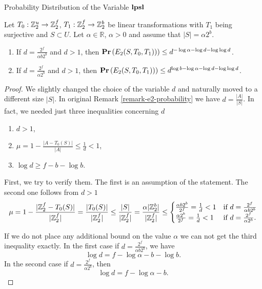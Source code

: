 \begin{section}{Probability Distribution of the Variable \texorpdfstring{$\mathbf{lpsl}$}{lpsl}}
\begin{statement}
\label{statement-e2-probability-linear-good}
Let $T_0: \mathbb{Z}_{2}^{u} \rightarrow \mathbb{Z}_{2}^{f}$, $T_1: \mathbb{Z}_{2}^{f} \rightarrow \mathbb{Z}_{2}^{b}$ be linear transformations with $T_1$ being surjective and $S \subset U$. Let $\alpha \in \mathbb{R}$, $\alpha > 0$ and assume that $|S| = \alpha 2 ^ b$.
\begin{enumerate}
\item If $d = \frac{2 ^ f}{\alpha b 2 ^ b}$ and $d > 1$, then $\mathbf{Pr}\left(E_2(S, T_0, T_1))\right) \leq d ^ {-\log \alpha - \log d - \log \log d}$.
\item If $d = \frac{2 ^ f}{\alpha 2 ^ b}$ and $d > 1$, then $\mathbf{Pr}\left(E_2(S, T_0, T_1))\right) \leq d ^ {\log b - \log \alpha - \log d - \log \log d}$.
\end{enumerate}
\end{statement}
\begin{proof}
We slightly changed the choice of the variable $d$ and naturally moved to a different size $|S|$. In original Remark \ref{remark-e2-probability} we have $d = \frac{|A|}{|S|}$. In fact, we needed just three inequalities concerning $d$
\begin{enumerate}
\item $d > 1$,
\item $\mu = 1 - \frac{|A - T_0(S)|}{|A|} \leq \frac{1}{d} < 1$,
\item $\log d \geq f - b - \log b$.
\end{enumerate}

First, we try to verify them. The first is an assumption of the statement. The second one follows from $d > 1$
\[
	\mu = 1 - \frac{|\mathbb{Z}_{2}^{f} - T_0(S)|}{|\mathbb{Z}_{2}^{f}|} = \frac{|T_0(S)|}{|\mathbb{Z}_{2}^{f}|} \leq \frac{|S|}{|\mathbb{Z}_{2}^{f}|} = \frac{\alpha |\mathbb{Z}_{2}^{b}|}{|\mathbb{Z}_{2}^{f}|} \leq 
\begin{cases}
\frac{\alpha b 2 ^ b}{2 ^ f} = \frac{1}{d} < 1 & \text{if } d = \frac{2 ^ f}{\alpha b 2 ^ b} \\
\frac{\alpha 2 ^ b}{2 ^ f} = \frac{1}{d} < 1 & \text{if } d = \frac{2 ^ f}{\alpha 2 ^ b} \text{.}
\end{cases}
\]

If we do not place any additional bound on the value $\alpha$ we can not get the third inequality exactly. In the first case if $d = \frac{2 ^ f}{\alpha b 2 ^ b}$, we have 
\[
	\log d = f - \log \alpha - b - \log b \text{.}
\]
In the second case if $d = \frac{2 ^ f}{\alpha 2 ^ b}$, then
\[
	\log d = f - \log \alpha - b \text{.}
\]


\end{proof}
\end{section}
